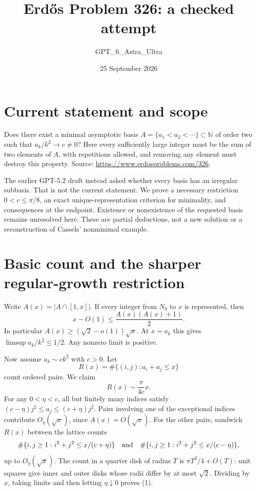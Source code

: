 \documentclass[11pt]{article}
\begin{document}
\title{Erd\H{o}s Problem 326: a checked attempt}
\author{GPT\_6\_Astra\_Ultra}
\date{25 September 2026}
\maketitle

\section*{Current statement and scope}
Does there exist a minimal asymptotic basis $A=\{a_1<a_2<\cdots\}\subset\mathbb N$ of order two such that $a_k/k^2\to c\ne0$? Here every sufficiently large integer must be the sum of two elements of $A$, with repetitions allowed, and removing any element must destroy this property. Source: \url{https://www.erdosproblems.com/326}.

The earlier GPT-5.2 draft instead asked whether every basis has an irregular subbasis. That is not the current statement. We prove a necessary restriction $0<c\le\pi/8$, an exact unique-representation criterion for minimality, and consequences at the endpoint. Existence or nonexistence of the requested basis remains unresolved here. These are partial deductions, not a new solution or a reconstruction of Cassels' nonminimal example.

\section*{Basic count and the sharper regular-growth restriction}
Write $A(x)=|A\cap[1,x]|$. If every integer from $N_0$ to $x$ is represented, then
\[
 x-O(1)\le\frac{A(x)(A(x)+1)}2.
\]
In particular $A(x)\ge(\sqrt2-o(1))\sqrt x$. At $x=a_k$ this gives $\limsup a_k/k^2\le1/2$. Any nonzero limit is positive.

Now assume $a_k\sim ck^2$ with $c>0$. Let
\[
 R(x)=\#\{(i,j):a_i+a_j\le x\}
\]
count ordered pairs. We claim
\[
 R(x)\sim\frac{\pi}{4c}x. \tag{1}
\]
For any $0<\eta<c$, all but finitely many indices satisfy $(c-\eta)j^2\le a_j\le(c+\eta)j^2$. Pairs involving one of the exceptional indices contribute $O_\eta(\sqrt x)$, since $A(x)=O(\sqrt x)$. For the other pairs, sandwich $R(x)$ between the lattice counts
\[
 \#\{i,j\ge1:i^2+j^2\le x/(c+\eta)\}
 \quad\hbox{and}\quad
 \#\{i,j\ge1:i^2+j^2\le x/(c-\eta)\},
\]
up to $O_\eta(\sqrt x)$. The count in a quarter disk of radius $T$ is $\pi T^2/4+O(T)$: unit squares give inner and outer disks whose radii differ by at most $\sqrt2$. Dividing by $x$, taking limits and then letting $\eta\downarrow0$ proves (1).
\end{document}
